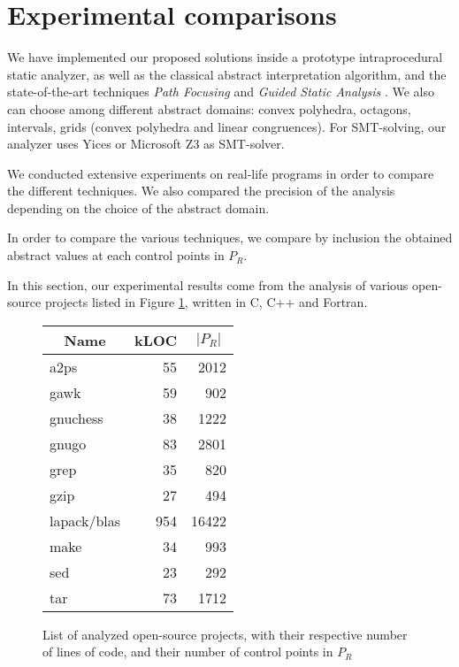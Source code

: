 \documentclass[preprint]{sigplanconf}
\begin{document}
\section{Experimental comparisons}
\label{sec:experiments}

We have implemented our proposed solutions inside a prototype intraprocedural
static analyzer,
as well as the classical abstract interpretation algorithm, and the state-of-the-art
techniques \emph{Path Focusing} \cite{Monniaux_Gonnord_SAS11} and \emph{Guided
Static Analysis} \cite{DBLP:conf/sas/GopanR07}.
We also can choose among different abstract domains: convex polyhedra, octagons,
intervals, grids (convex polyhedra and linear congruences).
For SMT-solving, our analyzer uses Yices
\cite{DBLP:conf/cav/DutertreM06} or Microsoft Z3\cite{DBLP:conf/tacas/MouraB08}
as SMT-solver.

We conducted extensive experiments on real-life programs in order to compare the
different techniques. We also compared the precision of the analysis depending
on the choice of the abstract domain.

In order to compare the various techniques, we compare by inclusion the obtained
abstract values at each control points in $P_R$.


In this section, our experimental results come from the analysis of various
open-source projects listed in Figure \ref{fig:projects}, written in C, C++ and
Fortran.
\begin{figure}[!h]
	\centering
\begin{tabular}{|l|r|r|} \hline
	\multicolumn{1}{|c|}{Name} &
        \multicolumn{1}{c|}{kLOC} &
        \multicolumn{1}{c|}{$|P_R|$} \\ \hline
	a2ps & 55 & 2012\\
	gawk & 59 & 902\\ 
	gnuchess & 38 & 1222\\ 
	gnugo & 83 & 2801\\
	grep & 35 & 820\\
	gzip & 27 & 494\\
	lapack/blas & 954 & 16422\\
	make & 34 & 993\\ 
	sed & 23 & 292\\
	tar & 73 & 1712\\
	\hline
\end{tabular}
\caption{List of analyzed open-source projects, with their respective number of
lines of code, and their number of control points in $P_R$}
\label{fig:projects}
\end{figure}
\end{document}
